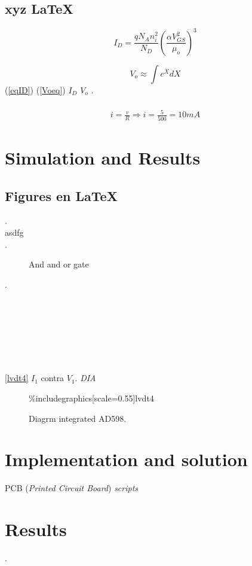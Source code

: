 \documentclass[journal]{IEEEtran}
\begin{document}
\subsection{xyz \LaTeX}

\begin{equation}\label{eqID}
I_D=\frac{q N_A n_i^2}{N_D}\left(\frac{\alpha V_{GS}^2}{\mu_o}\right)^3
\end{equation}

\begin{equation}\label{Voeq} 
V_o \approx \int e^XdX
\end{equation}
(\ref{eqID}) (\ref{Voeq}) 
$I_D$  $V_o$ 
.
\\
\\
\begin{gather*}
i=\frac{v}{R}\Longrightarrow i=\frac{5}{500}=10 mA
\end{gather*}
\section{Simulation and Results}

\subsection{Figures en \LaTeX}
.
\\
asdfg
\\
\cite{imagenes}. 

\begin{figure}[H]  
\centering  
\caption{And and or gate } 
\end{figure}
.
\\
\\
\\
\\
\\
\\
\\
\\
\ref{lvdt4}  $I_1$ contra $V_1$.
 \emph{DIA} \cite{dia} 
\begin{figure}[H] 
\centering 
\%includegraphics[scale=0.55]{lvdt4}
\caption{Diagrm integrated AD598.} 
\label{diafig}
\end{figure}


\section{Implementation and solution}
 PCB (\emph{Printed Circuit Board})  \emph{scripts} 
\section{Results}
.
\\
\\
\\
\\
\\
\\
\end{document}
